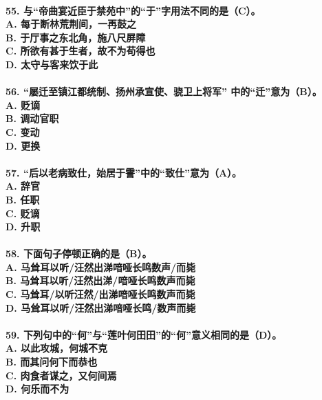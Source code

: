 \documentclass[UTF8]{ctexart} %
\begin{document}
\paragraph{
55. 与“帝曲宴近臣于禁苑中”的“于”字用法不同的是（\color{red}C\color{black}）。 \\
    A. 每于断林荒荆间，一再鼓之 \\
    B. 于厅事之东北角，施八尺屏障 \\
    C. 所欲有甚于生者，故不为苟得也 \\
    D. 太守与客来饮于此
}
\paragraph{
56. “屡迁至镇江都统制、扬州承宣使、骁卫上将军” 中的“迁”意为（\color{red}B\color{black}）。 \\
    A. 贬谪 \\
    B. 调动官职 \\
    C. 变动 \\
    D. 更换
}
\paragraph{
57. “后以老病致仕，始居于霅”中的“致仕”意为（\color{red}A\color{black}）。 \\
    A. 辞官 \\
    B. 任职 \\
    C. 贬谪 \\
    D. 升职
}
\paragraph{
58. 下面句子停顿正确的是（\color{red}B\color{black}）。 \\
    A. 马耸耳以听/汪然出涕喑哑长鸣数声/而毙 \\
    B. 马耸耳以听/汪然出涕/喑哑长鸣数声而毙 \\
    C. 马耸耳/以听汪然/出涕喑哑长鸣数声而毙 \\
    D. 马耸耳以听/汪然出涕喑哑长鸣/数声而毙
}
\paragraph{
59. 下列句中的“何”与“莲叶何田田”的“何”意义相同的是（\color{red}D\color{black}）。 \\
    A. 以此攻城，何城不克 \\
    B. 而其问何下而恭也 \\
    C. 肉食者谋之，又何间焉 \\
    D. 何乐而不为
}
\end{document}
